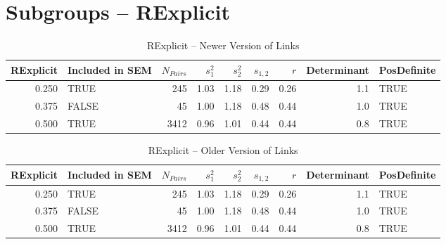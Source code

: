 \documentclass{article}\usepackage{graphicx, color}
\begin{document}
\section{Subgroups --  RExplicit }%
\begin{table}[ht]
\begin{center}
\begin{tabular}{rlrrrrrrl}
  \hline
RExplicit & Included in SEM & $N_{Pairs}$ & $s_1^2$ & $s_2^2$ & $s_{1,2}$ & $r$ & Determinant & PosDefinite \\ 
  \hline
0.250 & TRUE & 245 & 1.03 & 1.18 & 0.29 & 0.26 & 1.1 & TRUE \\ 
  0.375 & FALSE & 45 & 1.00 & 1.18 & 0.48 & 0.44 & 1.0 & TRUE \\ 
  0.500 & TRUE & 3412 & 0.96 & 1.01 & 0.44 & 0.44 & 0.8 & TRUE \\ 
   \hline
\end{tabular}
\caption{RExplicit -- Newer Version of Links}
\end{center}
\end{table}
\begin{table}[ht]
\begin{center}
\begin{tabular}{rlrrrrrrl}
  \hline
RExplicit & Included in SEM & $N_{Pairs}$ & $s_1^2$ & $s_2^2$ & $s_{1,2}$ & $r$ & Determinant & PosDefinite \\ 
  \hline
0.250 & TRUE & 245 & 1.03 & 1.18 & 0.29 & 0.26 & 1.1 & TRUE \\ 
  0.375 & FALSE & 45 & 1.00 & 1.18 & 0.48 & 0.44 & 1.0 & TRUE \\ 
  0.500 & TRUE & 3412 & 0.96 & 1.01 & 0.44 & 0.44 & 0.8 & TRUE \\ 
   \hline
\end{tabular}
\caption{RExplicit -- Older Version of Links}
\end{center}
\end{table}
\end{document}
